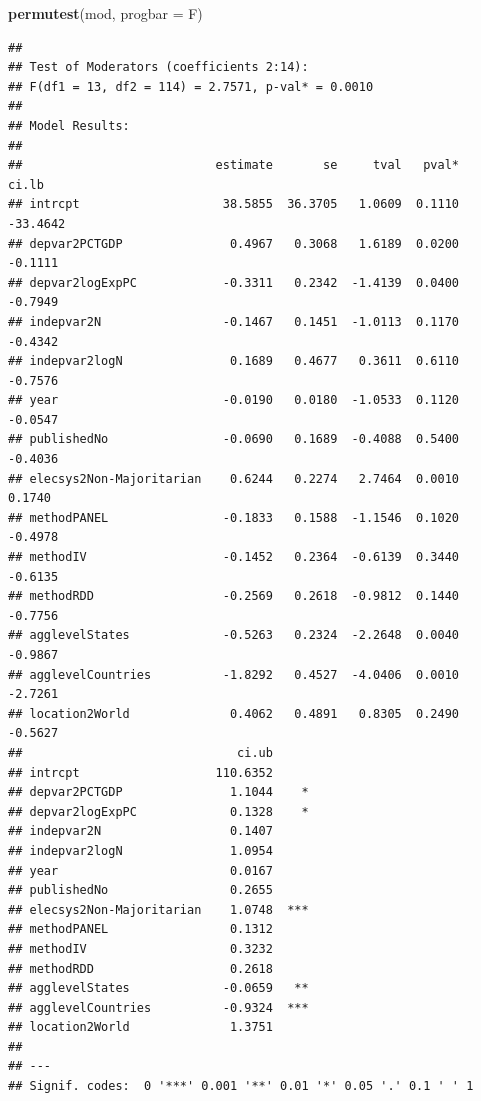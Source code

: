 \documentclass[
]{article}
\newenvironment{Shaded}{\begin{snugshade}}{\end{snugshade}}
\newcommand{\DataTypeTok}[1]{\textcolor[rgb]{0.13,0.29,0.53}{#1}}
\newcommand{\KeywordTok}[1]{\textcolor[rgb]{0.13,0.29,0.53}{\textbf{#1}}}
\newcommand{\NormalTok}[1]{#1}
\begin{document}
\begin{Shaded}
\begin{Highlighting}[]
\KeywordTok{permutest}\NormalTok{(mod, }\DataTypeTok{progbar =}\NormalTok{ F)}
\end{Highlighting}
\end{Shaded}

\begin{verbatim}
## 
## Test of Moderators (coefficients 2:14):
## F(df1 = 13, df2 = 114) = 2.7571, p-val* = 0.0010
## 
## Model Results:
## 
##                           estimate       se     tval   pval*     ci.lb 
## intrcpt                    38.5855  36.3705   1.0609  0.1110  -33.4642 
## depvar2PCTGDP               0.4967   0.3068   1.6189  0.0200   -0.1111 
## depvar2logExpPC            -0.3311   0.2342  -1.4139  0.0400   -0.7949 
## indepvar2N                 -0.1467   0.1451  -1.0113  0.1170   -0.4342 
## indepvar2logN               0.1689   0.4677   0.3611  0.6110   -0.7576 
## year                       -0.0190   0.0180  -1.0533  0.1120   -0.0547 
## publishedNo                -0.0690   0.1689  -0.4088  0.5400   -0.4036 
## elecsys2Non-Majoritarian    0.6244   0.2274   2.7464  0.0010    0.1740 
## methodPANEL                -0.1833   0.1588  -1.1546  0.1020   -0.4978 
## methodIV                   -0.1452   0.2364  -0.6139  0.3440   -0.6135 
## methodRDD                  -0.2569   0.2618  -0.9812  0.1440   -0.7756 
## agglevelStates             -0.5263   0.2324  -2.2648  0.0040   -0.9867 
## agglevelCountries          -1.8292   0.4527  -4.0406  0.0010   -2.7261 
## location2World              0.4062   0.4891   0.8305  0.2490   -0.5627 
##                              ci.ub 
## intrcpt                   110.6352      
## depvar2PCTGDP               1.1044    * 
## depvar2logExpPC             0.1328    * 
## indepvar2N                  0.1407      
## indepvar2logN               1.0954      
## year                        0.0167      
## publishedNo                 0.2655      
## elecsys2Non-Majoritarian    1.0748  *** 
## methodPANEL                 0.1312      
## methodIV                    0.3232      
## methodRDD                   0.2618      
## agglevelStates             -0.0659   ** 
## agglevelCountries          -0.9324  *** 
## location2World              1.3751      
## 
## ---
## Signif. codes:  0 '***' 0.001 '**' 0.01 '*' 0.05 '.' 0.1 ' ' 1
\end{verbatim}
\end{document}
